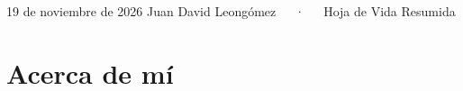 \documentclass[11pt,a4paper,]{awesome-cv}
\begin{document}
\makecvheader

\makecvfooter
  {19 de noviembre de 2026}
    {Juan David Leongómez~~~·~~~Hoja de Vida Resumida}
  {\thepage}





\section{Acerca de mí}\label{acerca-de-muxed}
\end{document}
